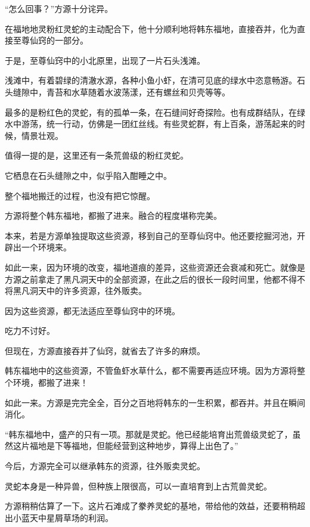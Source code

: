 
\begin{this_body}

“怎么回事？”方源十分诧异。

在福地地灵粉红灵蛇的主动配合下，他十分顺利地将韩东福地，直接吞并，化为直接至尊仙窍的一部分。

于是，至尊仙窍中的小北原里，出现了一片石头浅滩。

浅滩中，有着碧绿的清澈水源，各种小鱼小虾，在清可见底的绿水中恣意畅游。石头缝隙中，青苔和水草随着水波荡漾，还有螺丝和贝壳等等。

最多的是粉红色的灵蛇，有的孤单一条，在石缝间好奇探险。也有成群结队，在绿水中游荡，统一行动，仿佛是一团红丝线。有些灵蛇群，有上百条，游荡起来的时候，情景壮观。

值得一提的是，这里还有一条荒兽级的粉红灵蛇。

它栖息在石头缝隙之中，似乎陷入酣睡之中。

整个福地搬迁的过程，也没有把它惊醒。

方源将整个韩东福地，都搬了进来。融合的程度堪称完美。

本来，若是方源单独提取这些资源，移到自己的至尊仙窍中。他还要挖掘河池，开辟出一个环境来。

如此一来，因为环境的改变，福地道痕的差异，这些资源还会衰减和死亡。就像是方源之前拿走了黑凡洞天中的全部资源，在此之后的很长一段时间里，他都不得不将黑凡洞天中的许多资源，往外贩卖。

因为这些资源，都无法适应至尊仙窍中的环境。

吃力不讨好。

但现在，方源直接吞并了仙窍，就省去了许多的麻烦。

韩东福地中的这些资源，不管鱼虾水草什么，都不需要再适应环境。因为方源将整个环境，都搬了进来！

如此一来。方源是完完全全，百分之百地将韩东的一生积累，都吞并。并且在瞬间消化。

“韩东福地中，盛产的只有一项。那就是灵蛇。他已经能培育出荒兽级灵蛇了，虽然这片福地是下等福地，但能经营到这种地步，算得上出色了。”

今后，方源完全可以继承韩东的资源，往外贩卖灵蛇。

灵蛇本身是一种异兽，但种族上限很高，可以一直培育到上古荒兽灵蛇。

方源稍稍估算了一下。这片石滩成了豢养灵蛇的基地，带给他的效益，还要稍稍超出小蓝天中星屑草场的利润。


\end{this_body}
